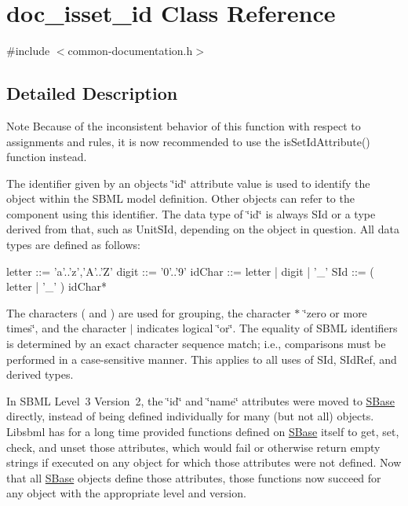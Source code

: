 \hypertarget{classdoc__isset__id}{}\section{doc\+\_\+isset\+\_\+id Class Reference}
\label{classdoc__isset__id}


{\ttfamily \#include $<$common-\/documentation.\+h$>$}



\subsection{Detailed Description}
\begin{DoxyNote}{Note}
Because of the inconsistent behavior of this function with respect to assignments and rules, it is now recommended to use the is\+Set\+Id\+Attribute() function instead.
\end{DoxyNote}
\begin{DoxyParagraph}{}
The identifier given by an object\textquotesingle{}s \char`\"{}id\char`\"{} attribute value is used to identify the object within the S\+B\+ML model definition. Other objects can refer to the component using this identifier. The data type of \char`\"{}id\char`\"{} is always {\ttfamily S\+Id} or a type derived from that, such as {\ttfamily Unit\+S\+Id}, depending on the object in question. All data types are defined as follows\+: 
\begin{DoxyPre}
     letter ::= 'a'..'z','A'..'Z'
     digit  ::= '0'..'9'
     idChar ::= letter | digit | '\_'
     SId    ::= ( letter | '\_' ) idChar*
   \end{DoxyPre}

\end{DoxyParagraph}
The characters {\ttfamily (} and {\ttfamily )} are used for grouping, the character {\ttfamily $\ast$} \char`\"{}zero or more times\char`\"{}, and the character {\ttfamily $\vert$} indicates logical \char`\"{}or\char`\"{}. The equality of S\+B\+ML identifiers is determined by an exact character sequence match; i.\+e., comparisons must be performed in a case-\/sensitive manner. This applies to all uses of {\ttfamily S\+Id}, {\ttfamily S\+Id\+Ref}, and derived types.

In S\+B\+ML Level~3 Version~2, the \char`\"{}id\char`\"{} and \char`\"{}name\char`\"{} attributes were moved to \hyperlink{class_s_base}{S\+Base} directly, instead of being defined individually for many (but not all) objects. Libsbml has for a long time provided functions defined on \hyperlink{class_s_base}{S\+Base} itself to get, set, check, and unset those attributes, which would fail or otherwise return empty strings if executed on any object for which those attributes were not defined. Now that all \hyperlink{class_s_base}{S\+Base} objects define those attributes, those functions now succeed for any object with the appropriate level and version.

